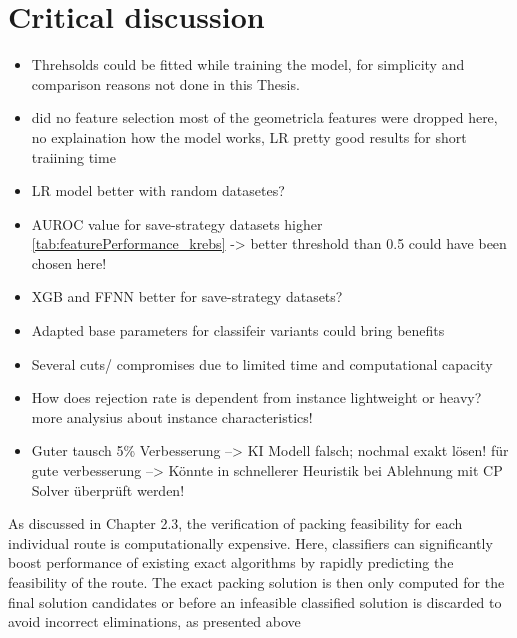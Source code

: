 \chapter{Critical discussion}
\label{chap:critical_discussion}
\begin{itemize}
	\item Threhsolds could be fitted while training the model, for simplicity and comparison reasons not done in this Thesis.
	\item \cite{zhang_learning-based_2022} did no feature selection most of the geometricla features were dropped here, no
	      explaination how the model works, \gls{LR} pretty good results for short traiining time
	\item LR model better with random datasetes?
	\item AUROC value for save-strategy datasets higher \ref{tab:featurePerformance_krebs} -> better threshold than 0.5 could have been chosen here!
	\item XGB and FFNN better for save-strategy datasets?
	\item Adapted base parameters for classifeir variants could bring benefits
	\item Several cuts/ compromises due to limited time and computational capacity
	\item How does rejection rate is dependent from instance lightweight or heavy? more analysius about instance characteristics!
	\item Guter tausch 5\% Verbesserung --> KI Modell falsch; nochmal exakt lösen! für gute verbesserung --> Könnte in schnellerer Heuristik bei Ablehnung mit CP Solver überprüft werden!
\end{itemize}

As discussed in Chapter 2.3, the verification of packing feasibility for each individual
route is computationally expensive. Here, classifiers can significantly boost performance
of existing exact algorithms by rapidly predicting the feasibility of the route. The exact
packing solution is then only computed for the final solution candidates or before an
infeasible classified solution is discarded to avoid incorrect eliminations, as presented
above

\clearpage
